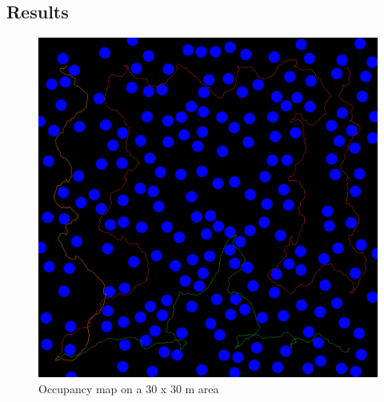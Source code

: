 \subsection{Results}
\begin{figure}[h]
\centering
\includegraphics[scale=0.08]{images/preview_map_frame_11193.png}
\caption{Occupancy map on a 30 x 30 m area}
\end{figure}
